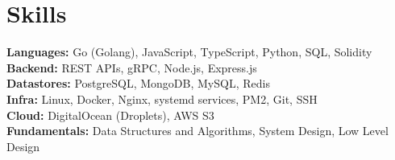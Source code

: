 \documentclass[]{resume-openfont}
\newcommand{\resumeHeading}[4]{\runsubsection{\uppercase{#1}}\descript{ | #2}\hfill\location{#3 | #4}\fakeNewLine}
\begin{document}
\sectionsep



\section{Skills}
\begin{skillList}
    \textbf{Languages:} Go (Golang), JavaScript, TypeScript, Python, SQL, Solidity \\
    \textbf{Backend:} REST APIs, gRPC, Node.js, Express.js \\
    \textbf{Datastores:} PostgreSQL, MongoDB, MySQL, Redis \\
    \textbf{Infra:} Linux, Docker, Nginx, systemd services, PM2, Git, SSH \\
    \textbf{Cloud:} DigitalOcean (Droplets), AWS S3 \\
    \textbf{Fundamentals:} Data Structures and Algorithms, System Design, Low Level Design
\end{skillList}

\end{document}
